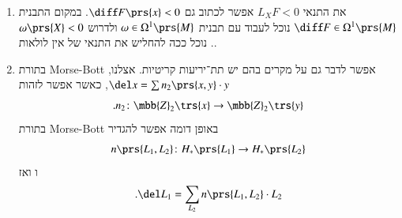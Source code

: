 \documentclass[a4paper,10pt,twoside,openany]{book}
\begin{document}
\begin{enumerate}
\item את התנאי
$L_X F < 0$
אפשר לכתוב גם
$\diff F \prs{x} < 0$.
במקום התבנית
$\diff F \in \Omega^1\prs{M}$
נוכל לעבוד עם תבנית
$\omega \in \Omega^1\prs{M}$
ולדרוש
$\omega\prs{X} < 0$.
נוכל ככה להחליש את התנאי של אין לולאות.

\item
בתורת
\textenglish{Morse-Bott}
אפשר לדבר גם על מקרים בהם יש תת־יריעות קריטיות.
אצלנו,
$\del x = \sum n_2\prs{x,y} \cdot y$,
כאשר אפשר לזהות
\[\text{.} n_2 \colon \mbb{Z}_2\trs{x} \to \mbb{Z}_2\trs{y}\]
בתורת
\textenglish{Morse-Bott}
באופן דומה אפשר להגדיר
\[n\prs{L_1, L_2} \colon H_*\prs{L_1} \to H_*\prs{L_2}\]ו
ואז
\begin{align*}
\text{.} \del L_1 = \sum_{L_2} n\prs{L_1, L_2} \cdot L_2
\end{align*}
\end{enumerate}









\backmatter
\end{document}
